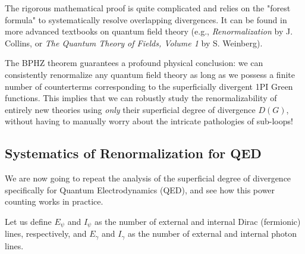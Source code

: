 The rigorous mathematical proof is quite complicated and relies on the "forest formula" to systematically resolve overlapping divergences. It can be found in more advanced textbooks on quantum field theory (e.g., \textit{Renormalization} by J. Collins, or \textit{The Quantum Theory of Fields, Volume 1} by S. Weinberg). 

The BPHZ theorem guarantees a profound physical conclusion: we can consistently renormalize any quantum field theory as long as we possess a finite number of counterterms corresponding to the superficially divergent 1PI Green functions. This implies that we can robustly study the renormalizability of entirely new theories using \textit{only} their superficial degree of divergence $D(G)$, without having to manually worry about the intricate pathologies of sub-loops!

\subsection{Systematics of Renormalization for QED}

We are now going to repeat the analysis of the superficial degree of divergence specifically for Quantum Electrodynamics (QED), and see how this power counting works in practice.

Let us define $E_{\psi}$ and $I_{\psi}$ as the number of external and internal Dirac (fermionic) lines, respectively, and $E_{\gamma}$ and $I_{\gamma}$ as the number of external and internal photon lines.


